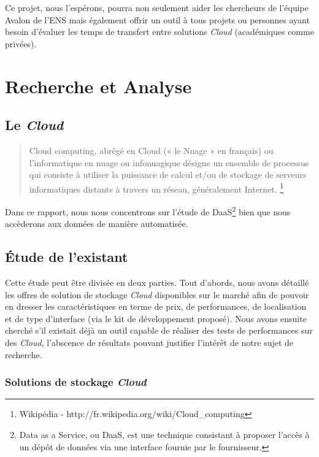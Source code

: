 \documentclass[10pt]{article}
\begin{document}
Ce projet, nous l’espérons, pourra non seulement aider les chercheurs de
l’équipe Avalon de l’ENS mais également offrir un outil à tous projets ou
personnes ayant besoin d’évaluer les temps de transfert entre solutions
\textit{Cloud} (académiques comme privées).


\section{Recherche et Analyse}

\subsection{Le \textit{Cloud}}

\begin{quote}
Cloud computing, abrégé en Cloud (« le Nuage » en français) ou l’informatique en nuage ou infonuagique désigne un ensemble de processus qui consiste à utiliser la puissance de calcul et/ou de stockage de serveurs informatiques distants à travers un réseau, généralement Internet.
\footnote{Wikipédia - http://fr.wikipedia.org/wiki/Cloud\_computing}\\
\end{quote}

Dans ce rapport, nous nous concentrons sur l'étude de DaaS\footnote{Data as a Service, ou DaaS, est une technique consistant à proposer l'accès à un dépôt de données via une interface fournie par le fournisseur.} bien que nous accèderons aux données de manière automatisée.


\subsection{Étude de l'existant}


Cette étude peut être divisée en deux parties. Tout d’abords, nous
avons détaillé les offres de solution de stockage \textit{Cloud}
disponibles sur le marché afin de pouvoir en dresser les
caractéristiques en terme de prix, de performances, de localisation et
de type d'interface (via le kit de développement proposé).  Nous avons
ensuite cherché s'il existait déjà un outil capable de réaliser des
tests de performances sur des \textit{Cloud}, l'abscence de résultats
pouvant justifier l'intérêt de notre sujet de recherche.


\subsubsection{Solutions de stockage \textit{Cloud}}
\end{document}
